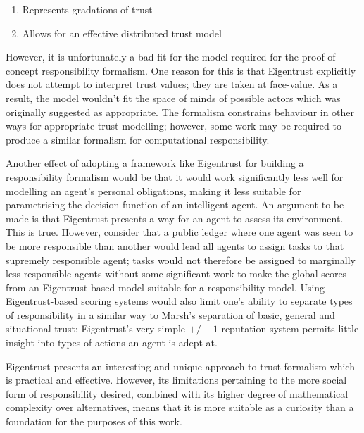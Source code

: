 \begin{enumerate}[label=\emph{\Alph*}:]
    \item Represents gradations of trust
    \item Allows for an effective distributed trust model
\end{enumerate}

However, it is unfortunately a bad fit for the model required for the proof-of-concept responsibility formalism. One reason for this is that Eigentrust explicitly does not attempt to interpret trust values; they are taken at face-value. As a result, the model wouldn't fit the space of minds of possible actors which was originally suggested as appropriate. The formalism constrains behaviour in other ways for appropriate trust modelling; however, some work may be required to produce a similar formalism for computational responsibility.\par

Another effect of adopting a framework like Eigentrust for building a responsibility formalism would be that it would work significantly less well for modelling an agent's personal obligations, making it less suitable for parametrising the decision function of an intelligent agent. An argument to be made is that Eigentrust presents a way for an agent to assess its environment. This is true. However, consider that a public ledger where one agent was seen to be more responsible than another would lead all agents to assign tasks to that supremely responsible agent; tasks would not therefore be assigned to marginally less responsible agents without some significant work to make the global scores from an Eigentrust-based model suitable for a responsibility model. Using Eigentrust-based scoring systems would also limit one's ability to separate types of responsibility in a similar way to Marsh's separation of basic, general and situational trust: Eigentrust's very simple \(+/-1\) reputation system permits little insight into types of actions an agent is adept at.\par

Eigentrust presents an interesting and unique approach to trust formalism which is practical and effective. However, its limitations pertaining to the more social form of responsibility desired, combined with its higher degree of mathematical complexity over alternatives, means that it is more suitable as a curiosity than a foundation for the purposes of this work.\par


